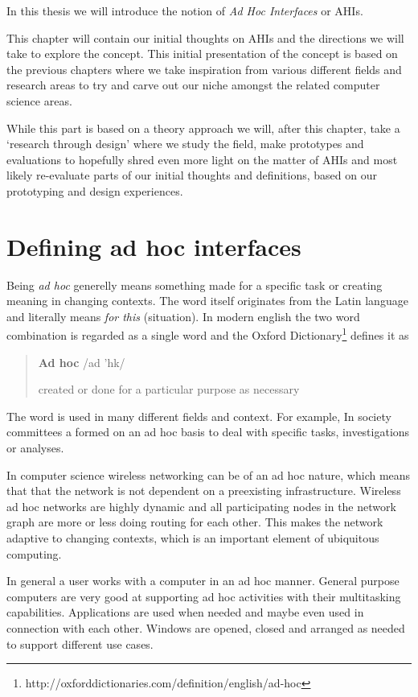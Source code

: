 
In this thesis we will introduce the notion of \emph{Ad Hoc Interfaces} or AHIs.

This chapter will contain our initial thoughts on AHIs and the directions we will take to explore the concept.
This initial presentation of the concept is based on the previous chapters where we take inspiration from various different fields and research areas to try and carve out our niche amongst the related computer science areas.

While this part is based on a theory approach we will, after this chapter, take a `research through design' where we study the field, make prototypes and evaluations to hopefully shred even more light on the matter of AHIs and most likely re-evaluate parts of our initial thoughts and definitions, based on our prototyping and design experiences. 

\section{Defining ad hoc interfaces}
Being \emph{ad hoc} generelly means something made for a specific task or creating meaning in changing contexts.
The word itself originates from the Latin language and literally means \emph{for this} (situation). 
In modern english the two word combination is regarded as a single word and the Oxford Dictionary\footnote{http://oxforddictionaries.com/definition/english/ad-hoc} defines it as

\begin{quotation}
\textbf{Ad hoc}  /ad 'h\textturnscripta k/

created or done for a particular purpose as necessary
\end{quotation}

The word is used in many different fields and context.
For example, In society committees a formed on an ad hoc basis to deal with specific tasks, investigations or analyses.

In computer science wireless networking can be of an ad hoc nature, which means that that the network is not dependent on a preexisting infrastructure.
Wireless ad hoc networks are highly dynamic and all participating nodes in the network graph are more or less doing routing for each other.
This makes the network adaptive to changing contexts, which is an important element of ubiquitous computing.

In general a user works with a computer in an ad hoc manner.
General purpose computers are very good at supporting ad hoc activities with their multitasking capabilities.
Applications are used when needed and maybe even used in connection with each other.
Windows are opened, closed and arranged as needed to support different use cases.

